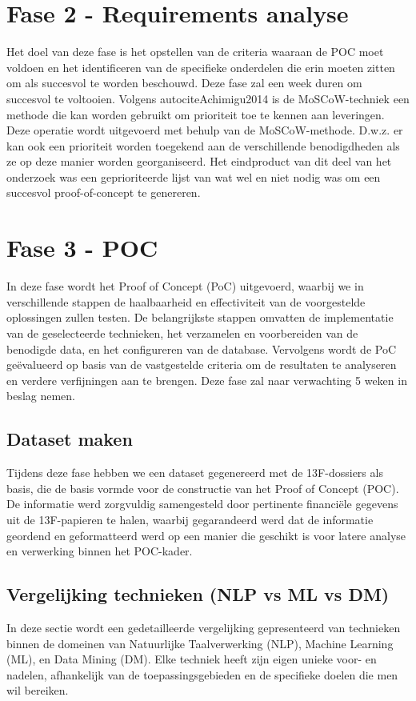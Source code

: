 \section{Fase 2 - Requirements analyse}
Het doel van deze fase is het opstellen van de criteria waaraan de POC moet voldoen en het identificeren van de specifieke onderdelen die erin moeten zitten om als succesvol te worden beschouwd. Deze fase zal een week duren om succesvol te voltooien. Volgens autocite{Achimigu2014} is de MoSCoW-techniek een methode die kan worden gebruikt om prioriteit toe te kennen aan leveringen. Deze operatie wordt uitgevoerd met behulp van de MoSCoW-methode. D.w.z. er kan ook een prioriteit worden toegekend aan de verschillende benodigdheden als ze op deze manier worden georganiseerd. Het eindproduct van dit deel van het onderzoek was een geprioriteerde lijst van wat wel en niet nodig was om een succesvol proof-of-concept te genereren. 

\section{Fase 3 - POC}  
In deze fase wordt het Proof of Concept (PoC) uitgevoerd, waarbij we in verschillende stappen de haalbaarheid en effectiviteit van de voorgestelde oplossingen zullen testen. De belangrijkste stappen omvatten de implementatie van de geselecteerde technieken, het verzamelen en voorbereiden van de benodigde data, en het configureren van de database. Vervolgens wordt de PoC geëvalueerd op basis van de vastgestelde criteria om de resultaten te analyseren en verdere verfijningen aan te brengen. Deze fase zal naar verwachting 5 weken in beslag nemen.
\subsection{Dataset maken}
Tijdens deze fase hebben we een dataset gegenereerd met de 13F-dossiers als basis, die de basis vormde voor de constructie van het Proof of Concept (POC). De informatie werd zorgvuldig samengesteld door pertinente financiële gegevens uit de 13F-papieren te halen, waarbij gegarandeerd werd dat de informatie geordend en geformatteerd werd op een manier die geschikt is voor latere analyse en verwerking binnen het POC-kader.

\subsection{Vergelijking technieken (NLP vs ML vs DM)}
In deze sectie wordt een gedetailleerde vergelijking gepresenteerd van technieken binnen de domeinen van Natuurlijke Taalverwerking (NLP), Machine Learning (ML), en Data Mining (DM). Elke techniek heeft zijn eigen unieke voor- en nadelen, afhankelijk van de toepassingsgebieden en de specifieke doelen die men wil bereiken.

